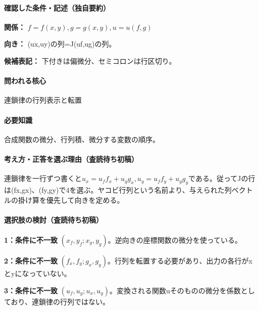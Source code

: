 \paragraph{確認した条件・記述（独自要約）}\mbox{}\par

\noindent\textbf{関係：} \(f=f(x,y),g=g(x,y),u=u(f,g)\)\par

\noindent\textbf{向き：} (ux,uy)の列=J(uf,ug)の列。\par

\noindent\textbf{候補表記：} 下付きは偏微分、セミコロンは行区切り。\par

\paragraph{問われる核心} 連鎖律の行列表示と転置

\paragraph{必要知識} 合成関数の微分、行列積、微分する変数の順序。

\paragraph{考え方・正答を選ぶ理由（査読待ち初稿）} 連鎖律を一行ずつ書くと\(u_x=u_ff_x+u_gg_x,u_y=u_ff_y+u_gg_y\)である。従ってJの行は(fx,gx)、(fy,gy)で4を選ぶ。ヤコビ行列という名前より、与えられた列ベクトルの掛け算を優先して向きを定める。

\paragraph{選択肢の検討（査読待ち初稿）}\mbox{}\par

\noindent\textbf{1：条件に不一致} \((x_f,y_f;x_g,y_g)\)。逆向きの座標関数の微分を使っている。\par

\noindent\textbf{2：条件に不一致} \((f_x,f_y;g_x,g_y)\)。行列を転置する必要があり、出力の各行がxとyになっていない。\par

\noindent\textbf{3：条件に不一致} \((u_f,u_g;u_x,u_y)\)。変換される関数uそのものの微分を係数としており、連鎖律の行列ではない。\par


